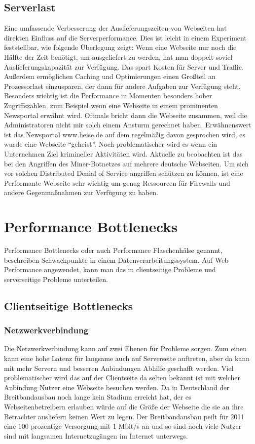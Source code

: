 \subsection{Serverlast}
Eine umfassende Verbesserung der Auslieferungszeiten von Webseiten hat direkten Einfluss auf die Serverperformance. Dies ist leicht in einem Experiment feststellbar, wie folgende Überlegung zeigt: Wenn eine Webseite nur noch die Hälfte der Zeit benötigt, um ausgeliefert zu werden, hat man doppelt soviel Auslieferungskapazität zur Verfügung. Das spart Kosten für Server und Traffic. Außerdem ermöglichen Caching und Optimierungen einen Großteil an Prozessorlast einzusparen, der dann für andere Aufgaben zur Verfügung steht. Besonders wichtig ist die Performance in Momenten besonders hoher Zugriffszahlen, zum Beispiel wenn eine Webseite in einem prominenten Newsportal erwähnt wird. Oftmals bricht dann die Webseite zusammen, weil die Administratoren nicht mir solch einem Ansturm gerechnet haben. Erwähnenswert ist das Newsportal www.heise.de auf dem regelmäßig davon gesprochen wird, es wurde eine Webseite ``geheist''. Noch problematischer wird es wenn ein Unternehmen Ziel krimineller Aktivitäten wird. Aktuelle zu beobachten ist das bei den Angriffen des Miner-Botnetzes auf mehrere deutsche Webseiten. Um sich vor solchen Distributed Denial of Service angriffen schützen zu können, ist eine Performante Webseite sehr wichtig um genug Ressourcen für Firewalls und andere Gegenmaßnahmen zur Verfügung zu haben.

\section{Performance Bottlenecks}
Performance Bottlenecks oder auch Performance Flaschenhälse genannt, beschreiben Schwachpunkte in einem Datenverarbeitungssystem. Auf Web Performance angewendet, kann man das in clientseitige Probleme und serverseitige Probleme unterteilen.
\subsection{Clientseitige Bottlenecks}
\subsubsection{Netzwerkverbindung}Die Netzwerkverbindung kann auf zwei Ebenen für Probleme sorgen. Zum einen kann eine hohe Latenz für langsame auch auf Serverseite auftreten, aber da kann mit mehr Servern und besseren Anbindungen Abhilfe geschafft werden. Viel problematischer wird das auf der Clientseite da selten bekannt ist mit welcher Anbindung Nutzer eine Webseite besuchen werden.%
Da in Deutschland der Breitbandausbau noch lange kein Stadium erreicht hat, der es Webseitenbetreibern erlauben würde auf die Größe der Webseite die sie an ihre Betrachter ausliefern keinen Wert zu legen. Der Breitbandausbau peilt für 2011 eine 100 prozentige Versorgung mit 1 Mbit/s an und so sind noch viele Nutzer sind mit langsamen Internetzugängen im Internet unterwegs. 

